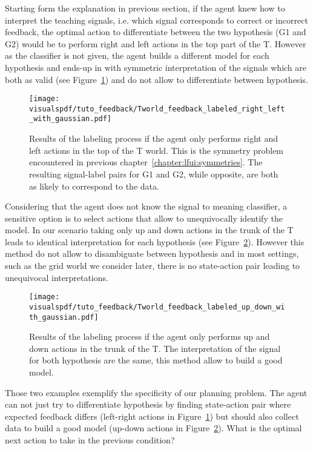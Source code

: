 Starting form the explanation in previous section, if the agent knew how to interpret the teaching signals, i.e. which signal corresponds to correct or incorrect feedback, the optimal action to differentiate between the two hypothesis (G1 and G2) would be to perform right and left actions in the top part of the T. However as the classifier is not given, the agent builds a different model for each hypothesis and ends-up in with symmetric interpretation of the signals which are both as valid (see Figure~\ref{fig:planningrightleft}) and do not allow to differentiate between hypothesis.

\begin{figure}[!ht]
  \centering
  \texttt{[image: \\visualspdf/tuto\_feedback/Tworld\_feedback\_labeled\_right\_left\_with\_gaussian.pdf]}
  \caption{Results of the labeling process if the agent only performs right and left actions in the top of the T world. This is the symmetry problem encountered in previous chapter~\ref{chapter:lfui:symmetries}. The resulting signal-label pairs for G1 and G2, while opposite, are both as likely to correspond to the data.}
  \label{fig:planningrightleft}
\end{figure}

Considering that the agent does not know the signal to meaning classifier, a sensitive option is to select actions that allow to unequivocally identify the model. In our scenario taking only up and down actions in the trunk of the T leads to identical interpretation for each hypothesis (see Figure~\ref{fig:planningupdown}). However this method do not allow to disambiguate between hypothesis and in most settings, such as the grid world we consider later, there is no state-action pair leading to unequivocal interpretations.

\begin{figure}[!ht]
  \centering
  \texttt{[image: \\visualspdf/tuto\_feedback/Tworld\_feedback\_labeled\_up\_down\_with\_gaussian.pdf]}
  \caption{Results of the labeling process if the agent only performs up and down actions in the trunk of the T. The interpretation of the signal for both hypothesis are the same, this method allow to build a good model.}
  \label{fig:planningupdown}
\end{figure}

Those two examples exemplify the specificity of our planning problem. The agent can not just try to differentiate hypothesis by finding state-action pair where expected feedback differs (left-right actions in Figure~\ref{fig:planningrightleft}) but should also collect data to build a good model (up-down actions in Figure~\ref{fig:planningupdown}). What is the optimal next action to take in the previous condition?

